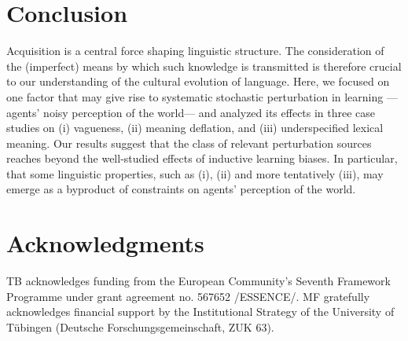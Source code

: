 \documentclass[10pt,a4paper]{article}
\begin{document}
\section{Conclusion}
Acquisition is a central force shaping linguistic structure. The consideration of the
(imperfect) means by which such knowledge is transmitted is therefore crucial to our
understanding of the cultural evolution of language. Here, we focused on one factor that may
give rise to systematic stochastic perturbation in learning ---agents' noisy perception of the
world--- and analyzed its effects in three case studies on (i) vagueness, (ii) meaning
deflation, and (iii) underspecified lexical meaning. Our results suggest that the class of
relevant perturbation sources reaches beyond the well-studied effects of inductive learning
biases. In particular, that some linguistic properties, such as (i), (ii) and more tentatively
(iii), may emerge as a byproduct of constraints on agents' perception of the world.


\section{Acknowledgments}
TB   acknowledges   funding   from   the   European   Community's Seventh Framework Programme under grant agreement no.  567652 /ESSENCE/.  
MF gratefully acknowledges financial support by the Institutional Strategy of the University
of T\"{u}bingen (Deutsche Forschungsgemeinschaft, ZUK 63). 






\setlength{\bibleftmargin}{.125in}
\setlength{\bibindent}{-\bibleftmargin}


\end{document}
